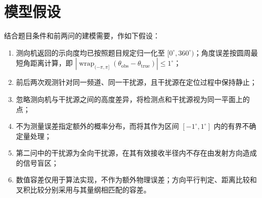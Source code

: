 \section{模型假设}

结合题目条件和前两问的建模需要，作如下假设：

\begin{enumerate}
  \item 测向机返回的示向度均已按照题目规定归一化至 $[0^\circ,360^\circ)$；角度误差按圆周最短角距离计算，即
  $\left|\operatorname{wrap}_{(-\pi,\pi]}(\theta_{\mathrm{obs}}-\theta_{\mathrm{true}})\right|\leq1^\circ$；
  \item 前后两次观测针对同一频道、同一干扰源，且干扰源在定位过程中保持静止；
  \item 忽略测向机与干扰源之间的高度差异，将检测点和干扰源视为同一平面上的点；
  \item 不为测量误差指定额外的概率分布，而将其作为区间 $[-1^\circ,1^\circ]$ 内的有界不确定量处理；
  \item 第二问中的干扰源为全向干扰源，在其有效接收半径内不存在由发射方向造成的信号盲区；
  \item 数值容差仅用于算法实现，不作为额外物理误差；方向平行判定、距离比较和叉积比较分别采用与其量纲相匹配的容差。
\end{enumerate}
